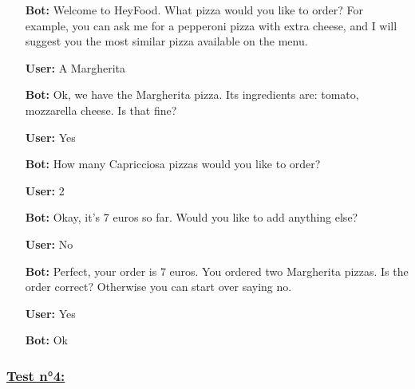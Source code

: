 \begin{itemize}

\item[\textbf{Bot:}] Welcome to HeyFood.
What pizza would you like to order? For example, you can ask me for a pepperoni pizza with extra cheese, and I will suggest you the most similar pizza available on the menu.


\item[\textbf{User:}] A Margherita

\item[\textbf{Bot:}] Ok, we have the Margherita pizza. Its ingredients are: tomato, mozzarella cheese. Is that fine?

\item[\textbf{User:}]Yes

\item[\textbf{Bot:}] How many Capricciosa pizzas would you like to order?

\item[\textbf{User:}]2

\item[\textbf{Bot:}]Okay, it’s 7 euros so far. Would you like to add anything else?

\item[\textbf{User:}]No

\item[\textbf{Bot:}] Perfect, your order is 7 euros. You ordered  two Margherita pizzas. Is the order correct? Otherwise you can start over saying no.

\item[\textbf{User:}]Yes

\item[\textbf{Bot:}]Ok

\end{itemize}

\subsubsection*{\underline{Test n°4:} }

